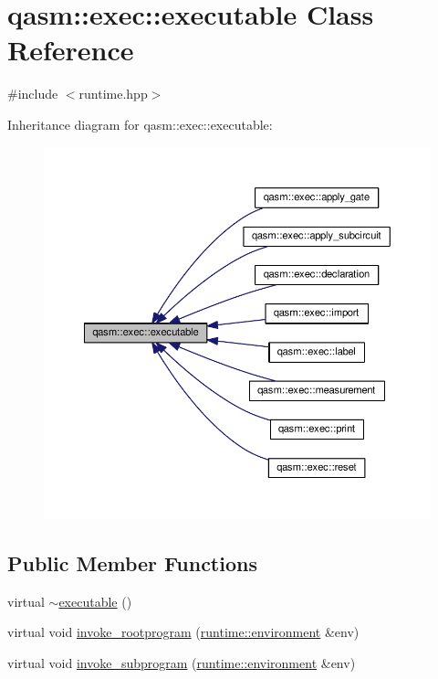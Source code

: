 \hypertarget{classqasm_1_1exec_1_1executable}{}\section{qasm\+:\+:exec\+:\+:executable Class Reference}
\label{classqasm_1_1exec_1_1executable}


{\ttfamily \#include $<$runtime.\+hpp$>$}



Inheritance diagram for qasm\+:\+:exec\+:\+:executable\+:\nopagebreak
\begin{figure}[H]
\begin{center}
\leavevmode
\includegraphics[width=350pt]{classqasm_1_1exec_1_1executable__inherit__graph}
\end{center}
\end{figure}
\subsection*{Public Member Functions}
\begin{DoxyCompactItemize}
\item 
virtual \hyperlink{classqasm_1_1exec_1_1executable_acb10539ca9f0d75be23e23ca722ba195}{$\sim$executable} ()
\item 
virtual void \hyperlink{classqasm_1_1exec_1_1executable_ad07f864a889edb0777ebbb1bc1628121}{invoke\+\_\+rootprogram} (\hyperlink{classqasm_1_1runtime_1_1environment}{runtime\+::environment} \&env)
\item 
virtual void \hyperlink{classqasm_1_1exec_1_1executable_ad73a67bcb74196954455b45804944544}{invoke\+\_\+subprogram} (\hyperlink{classqasm_1_1runtime_1_1environment}{runtime\+::environment} \&env)
\end{DoxyCompactItemize}


